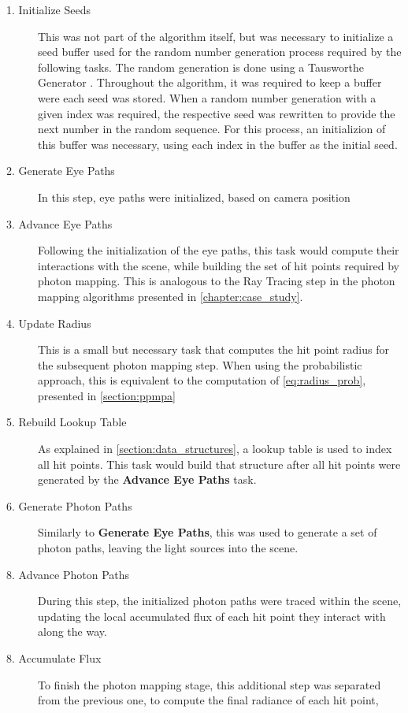 \documentclass[main.tex]{subfiles}
\begin{document}
\begin{description}

\item[1. Initialize Seeds] This was not part of the algorithm itself, but was necessary to initialize a seed buffer used for the random number generation process required by the following tasks. The random generation is done using a Tausworthe Generator \cite{tausworthe1965random}. Throughout the algorithm, it was required to keep a buffer were each seed was stored. When a random number generation with a given index was required, the respective seed was rewritten to provide the next number in the random sequence. For this process, an initializion of this buffer was necessary, using each index in the buffer as the initial seed.

\item[2. Generate Eye Paths] In this step, eye paths were initialized, based on camera position

\item[3. Advance Eye Paths] Following the initialization of the eye paths, this task would compute their interactions with the scene, while building the set of hit points required by photon mapping. This is analogous to the Ray Tracing step in the photon mapping algorithms presented in \cref{chapter:case_study}.

\item[4. Update Radius] This is a small but necessary task that computes the hit point radius for the subsequent photon mapping step. When using the probabilistic approach, this is equivalent to the computation of \cref{eq:radius_prob}, presented in \cref{section:ppmpa}

\item[5. Rebuild Lookup Table] As explained in \cref{section:data_structures}, a lookup table is used to index all hit points. This task would build that structure after all hit points were generated by the \textbf{Advance Eye Paths} task.

\item[6. Generate Photon Paths] Similarly to \textbf{Generate Eye Paths}, this was used to generate a set of photon paths, leaving the light sources into the scene.

\item[8. Advance Photon Paths] During this step, the initialized photon paths were traced within the scene, updating the local accumulated flux of each hit point they interact with along the way.

\item[8. Accumulate Flux] To finish the photon mapping stage, this additional step was separated from the previous one, to compute the final radiance of each hit point,


\end{description}
\end{document}
